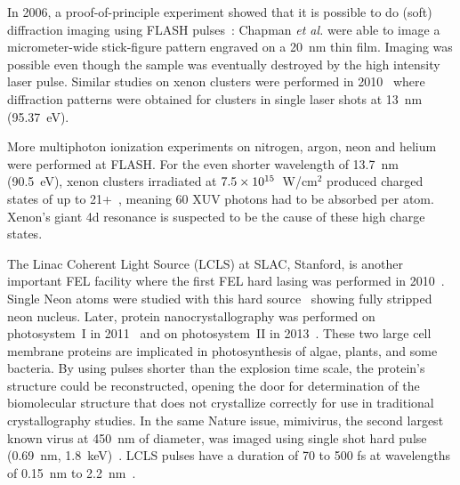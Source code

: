 In 2006, a proof-of-principle experiment showed that it is possible to
do (soft) \xray diffraction imaging using FLASH pulses~\cite{Chapman2006}:
Chapman \textit{et al.} were able to image a micrometer-wide stick-figure pattern
engraved on a 20~nm thin film. Imaging was possible even though the sample was
eventually destroyed by the high intensity \xray laser pulse.
Similar studies on xenon clusters were performed in 2010~\cite{Bostedt2010} where
diffraction patterns were obtained for clusters in single laser shots
at 13~nm (95.37~eV).

More multiphoton
ionization experiments on nitrogen, argon, neon and helium were performed at
FLASH.
For the even shorter wavelength of 13.7~nm (90.5~eV), xenon clusters irradiated at
$\ten{7.5}{15}$~W/cm$^2$ produced charged states of up to 21+~\cite{Sorokin2007,Richter2009},
meaning 60 XUV photons had to be absorbed per atom. Xenon's giant 4d
resonance is suspected to be the cause of these high charge states.

The Linac Coherent Light Source (LCLS) at SLAC, Stanford, is another important
FEL facility where the first FEL hard \xrays lasing was
performed in 2010~\cite{Emma2010,Schneider2010}. Single Neon atoms were studied with
this hard \xray source~\cite{Young2010} showing fully stripped neon nucleus.
Later, protein nanocrystallography was performed
on photosystem~I in 2011~\cite{Chapman2011} and on photosystem~II in
2013~\cite{Kern2013}. These two large cell membrane proteins are implicated in
photosynthesis of algae, plants, and some bacteria.
By using pulses shorter
than the explosion time scale, the protein's structure could be reconstructed,
opening the door for determination of the biomolecular structure that
does not crystallize correctly for use in traditional crystallography studies.
In the same Nature issue, mimivirus, the second largest known virus at 450~nm
of diameter, was imaged using single shot hard \xray pulse (0.69~nm,
1.8~keV)~\cite{Seibert2011}. LCLS pulses have a duration of 70 to 500 fs at
wavelengths of 0.15~nm to 2.2~nm~\cite{Pellegrini2011}.

